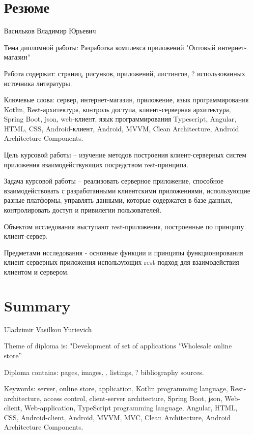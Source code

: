 \section*{Резюме}\label{sec:cw-ru}\indent

Васильков Владимир Юрьевич

Тема дипломной работы: Разработка комплекса приложений "Оптовый интернет-магазин”

Работа содержит: \pageref{LastPage} страниц,  рисунков,  приложений,  листингов, ? использованных источника литературы.

Ключевые слова: сервер, интернет-магазин, приложение, язык программирования Kotlin, Rest-архитектура, контроль доступа, клиент-серверная архитектура, Spring Boot, json, web-клиент, язык программирования Typescript, Angular, HTML, CSS, Android-клиент, Android, MVVM, Clean Architecture, Android Architecture Components.

Цель курсовой работы – изучение методов построения клиент-серверных систем приложения взаимодействующих посредством rest-принципа.

Задача курсовой работы – реализовать серверное приложение, способное взаимодействовать с разработанными клиентскими приложениями, использующие разные платформы, управлять данными, которые содержатся в базе данных, контролировать доступ и привилегии пользователей.

Объектом исследования выступают rest-приложения, построенные по принципу клиент-сервер.

Предметами исследования - основные функции и принципы функционирования клиент-серверных приложения использующих rest-подход для взаимодействия клиентом и сервером.

\section*{Summary}\label{sec:cw-eng}\indent
{}

Uladzimir Vasilkou Yurievich

Theme of diploma is: "Development of set of applications "Wholesale online store”

Diploma contains: \pageref{LastPage} pages,  images, ,  listings, ? bibliography sources.

Keywords: server, online store, application, Kotlin programming language, Rest-architecture, access control, client-server architecture, Spring Boot, json, Web-client, Web-application, TypeScript programming language, Angular, HTML, CSS, Android-client, Android, MVVM, MVC, Clean Architecture, Android Architecture Components.

